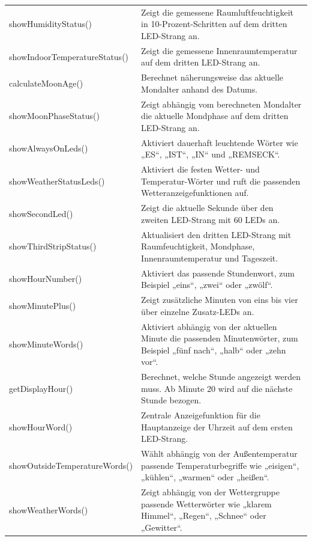 \begin{longtable}{p{} p{}}
{\small\ttfamily showHumidityStatus()} &
Zeigt die gemessene Raumluftfeuchtigkeit in 10-Prozent-Schritten auf dem dritten LED-Strang an. \\

{\small\ttfamily showIndoorTemperatureStatus()} &
Zeigt die gemessene Innenraumtemperatur auf dem dritten LED-Strang an. \\

{\small\ttfamily calculateMoonAge()} &
Berechnet näherungsweise das aktuelle Mondalter anhand des Datums. \\

{\small\ttfamily showMoonPhaseStatus()} &
Zeigt abhängig vom berechneten Mondalter die aktuelle Mondphase auf dem dritten LED-Strang an. \\

{\small\ttfamily showAlwaysOnLeds()} &
Aktiviert dauerhaft leuchtende Wörter wie „ES“, „IST“, „IN“ und „REMSECK“. \\

{\small\ttfamily showWeatherStatusLeds()} &
Aktiviert die festen Wetter- und Temperatur-Wörter und ruft die passenden Wetteranzeigefunktionen auf. \\

{\small\ttfamily showSecondLed()} &
Zeigt die aktuelle Sekunde über den zweiten LED-Strang mit 60 LEDs an. \\

{\small\ttfamily showThirdStripStatus()} &
Aktualisiert den dritten LED-Strang mit Raumfeuchtigkeit, Mondphase, Innenraumtemperatur und Tageszeit. \\

{\small\ttfamily showHourNumber()} &
Aktiviert das passende Stundenwort, zum Beispiel „eins“, „zwei“ oder „zwölf“. \\

{\small\ttfamily showMinutePlus()} &
Zeigt zusätzliche Minuten von eins bis vier über einzelne Zusatz-LEDs an. \\

{\small\ttfamily showMinuteWords()} &
Aktiviert abhängig von der aktuellen Minute die passenden Minutenwörter, zum Beispiel „fünf nach“, „halb“ oder „zehn vor“. \\

{\small\ttfamily getDisplayHour()} &
Berechnet, welche Stunde angezeigt werden muss. Ab Minute 20 wird auf die nächste Stunde bezogen. \\

{\small\ttfamily showHourWord()} &
Zentrale Anzeigefunktion für die Hauptanzeige der Uhrzeit auf dem ersten LED-Strang. \\

{\small\ttfamily showOutsideTemperatureWords()} &
Wählt abhängig von der Außentemperatur passende Temperaturbegriffe wie „eisigen“, „kühlen“, „warmen“ oder „heißen“. \\

{\small\ttfamily showWeatherWords()} &
Zeigt abhängig von der Wettergruppe passende Wetterwörter wie „klarem Himmel“, „Regen“, „Schnee“ oder „Gewitter“. \\

\end{longtable}

